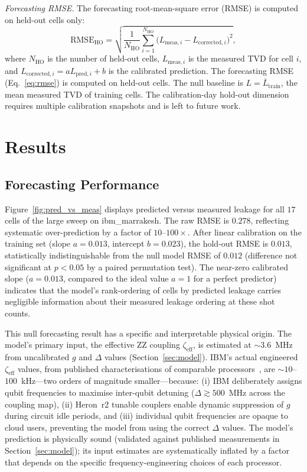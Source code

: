 \documentclass[ASNA,twocolumn]{USG}
\begin{document}
\textit{Forecasting RMSE.} The forecasting root-mean-square error (RMSE) is computed on held-out cells only:
\begin{equation}
    \mathrm{RMSE}_{\mathrm{HO}} = \sqrt{\frac{1}{N_{\mathrm{HO}}} \sum_{i=1}^{N_{\mathrm{HO}}} \bigl(L_{\mathrm{meas},i} - L_{\mathrm{corrected},i}\bigr)^2},
\label{eq:rmse}
\end{equation}
where $N_{\mathrm{HO}}$ is the number of held-out cells, $L_{\mathrm{meas},i}$ is the measured TVD for cell $i$, and $L_{\mathrm{corrected},i} = a L_{\mathrm{pred},i} + b$ is the calibrated prediction. The forecasting RMSE (Eq.~\ref{eq:rmse}) is computed on held-out cells. The null baseline is $L = \bar{L}_{\mathrm{train}}$, the mean measured TVD of training cells. The calibration-day hold-out dimension requires multiple calibration snapshots and is left to future work.

\section{Results}
\label{sec:results}

\subsection{Forecasting Performance}

Figure~\ref{fig:pred_vs_meas} displays predicted versus measured leakage for all $17$ cells of the large sweep on ibm\_marrakesh. The raw RMSE is $0.278$, reflecting systematic over-prediction by a factor of $10$--$100\times$. After linear calibration on the training set (slope $a = 0.013$, intercept $b = 0.023$), the hold-out RMSE is $0.013$, statistically indistinguishable from the null model RMSE of $0.012$ (difference not significant at $p < 0.05$ by a paired permutation test). The near-zero calibrated slope ($a = 0.013$, compared to the ideal value $a = 1$ for a perfect predictor) indicates that the model's rank-ordering of cells by predicted leakage carries negligible information about their measured leakage ordering at these shot counts.

This null forecasting result has a specific and interpretable physical origin. The model's primary input, the effective ZZ coupling $\zeta_{\mathrm{eff}}$, is estimated at $\sim 3.6$~MHz from uncalibrated $g$ and $\Delta$ values (Section~\ref{sec:model}). IBM's actual engineered $\zeta_{\mathrm{eff}}$ values, from published characterisations of comparable processors~\cite{alghadeer2025crosstalk}, are $\sim 10$--$100$~kHz---two orders of magnitude smaller---because: (i) IBM deliberately assigns qubit frequencies to maximise inter-qubit detuning ($\Delta \gtrsim 500$~MHz across the coupling map), (ii) Heron~r2 tunable couplers enable dynamic suppression of $g$ during circuit idle periods, and (iii) individual qubit frequencies are opaque to cloud users, preventing the model from using the correct $\Delta$ values. The model's prediction is physically sound (validated against published measurements in Section~\ref{sec:model}); its input estimates are systematically inflated by a factor that depends on the specific frequency-engineering choices of each processor.
\end{document}
